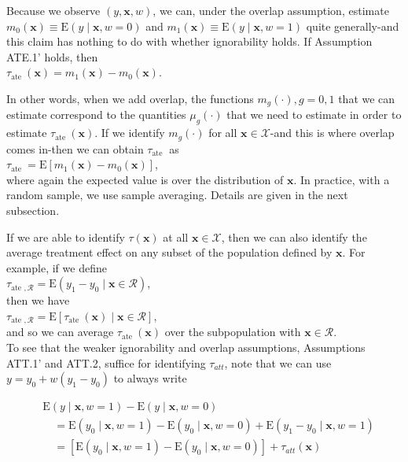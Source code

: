 \documentclass[10pt]{article}
\begin{document}
Because we observe $(y, \mathbf{x}, w)$, we can, under the overlap assumption, estimate $m_{0}(\mathbf{x}) \equiv \mathrm{E}(y \mid \mathbf{x}, w=0)$ and $m_{1}(\mathbf{x}) \equiv \mathrm{E}(y \mid \mathbf{x}, w=1)$ quite generally-and this claim has nothing to do with whether ignorability holds. If Assumption ATE.1' holds, then\\
$\tau_{\text {ate }}(\mathbf{x})=m_{1}(\mathbf{x})-m_{0}(\mathbf{x})$.

In other words, when we add overlap, the functions $m_{g}(\cdot), g=0,1$ that we can estimate correspond to the quantities $\mu_{g}(\cdot)$ that we need to estimate in order to estimate $\tau_{\text {ate }}(\mathbf{x})$. If we identify $m_{g}(\cdot)$ for all $\mathbf{x} \in \mathscr{X}$-and this is where overlap comes in-then we can obtain $\tau_{\text {ate }}$ as\\
$\tau_{\text {ate }}=\mathrm{E}\left[m_{1}(\mathbf{x})-m_{0}(\mathbf{x})\right]$,\\
where again the expected value is over the distribution of $\mathbf{x}$. In practice, with a random sample, we use sample averaging. Details are given in the next subsection.

If we are able to identify $\tau(\mathbf{x})$ at all $\mathbf{x} \in \mathscr{X}$, then we can also identify the average treatment effect on any subset of the population defined by $\mathbf{x}$. For example, if we define\\
$\tau_{\text {ate }, \mathscr{R}}=\mathrm{E}\left(y_{1}-y_{0} \mid \mathbf{x} \in \mathscr{R}\right)$,\\
then we have\\
$\tau_{\text {ate }, \mathscr{R}}=\mathrm{E}\left[\tau_{\text {ate }}(\mathbf{x}) \mid \mathbf{x} \in \mathscr{R}\right]$,\\
and so we can average $\tau_{\text {ate }}(\mathbf{x})$ over the subpopulation with $\mathbf{x} \in \mathscr{R}$.\\
To see that the weaker ignorability and overlap assumptions, Assumptions ATT.1' and ATT.2, suffice for identifying $\tau_{a t t}$, note that we can use $y=y_{0}+w\left(y_{1}-y_{0}\right)$ to always write


\begin{align*}
& \mathrm{E}(y \mid \mathbf{x}, w=1)-\mathrm{E}(y \mid \mathbf{x}, w=0) \\
& \quad=\mathrm{E}\left(y_{0} \mid \mathbf{x}, w=1\right)-\mathrm{E}\left(y_{0} \mid \mathbf{x}, w=0\right)+\mathrm{E}\left(y_{1}-y_{0} \mid \mathbf{x}, w=1\right) \\
& \quad=\left[\mathrm{E}\left(y_{0} \mid \mathbf{x}, w=1\right)-\mathrm{E}\left(y_{0} \mid \mathbf{x}, w=0\right)\right]+\tau_{a t t}(\mathbf{x}) \tag{21.18}
\end{align*}
\end{document}
